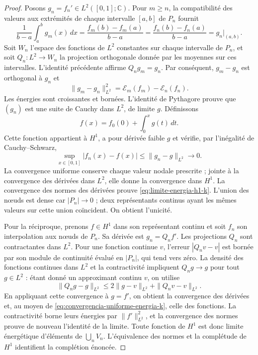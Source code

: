 \begin{proof}
Posons \(g_n=f_n'\in L^2([0,1];\mathbb C)\). Pour
\(m\geq n\), la compatibilité des valeurs aux extrémités de chaque
intervalle \([a,b]\) de \(P_n\) fournit
\[
 \frac1{b-a}\int_a^bg_m(x)\,dx
 =\frac{f_m(b)-f_m(a)}{b-a}
 =\frac{f_n(b)-f_n(a)}{b-a}
 =g_n\big|_{(a,b)}.
\]
Soit \(W_n\) l’espace des fonctions de \(L^2\) constantes sur chaque
intervalle de \(P_n\), et soit \(Q_n:L^2\to W_n\) la projection
orthogonale donnée par les moyennes sur ces intervalles. L’identité
précédente affirme \(Q_ng_m=g_n\). Par conséquent,
\(g_m-g_n\) est orthogonal à \(g_n\) et
\begin{equation}
 \|g_m-g_n\|_{L^2}^2
 =\mathcal E_m(f_m)-\mathcal E_n(f_n).
 \label{eq:pitagoras-gradientes-k}
\end{equation}
Les énergies sont croissantes et bornées. L'identité de Pythagore prouve que \((g_n)\) est une suite de Cauchy dans \(L^2\), de limite \(g\). Définissons
\[
 f(x)=f_0(0)+\int_0^xg(t)\,dt.
\]
Cette fonction appartient à \(H^1\), a pour dérivée faible \(g\) et
vérifie, par l’inégalité de Cauchy--Schwarz,
\begin{equation}
 \sup_{x\in[0,1]}|f_n(x)-f(x)|
 \leq\|g_n-g\|_{L^2}\longrightarrow0.
 \label{eq:convergencia-uniforme-energia-k}
\end{equation}
La convergence uniforme conserve chaque valeur nodale prescrite ; jointe à
la convergence des dérivées dans \(L^2\), elle donne la convergence dans
\(H^1\). La convergence des normes des dérivées prouve
\eqref{eq:limite-energia-h1-k}. L’union des nœuds est dense car
\(|P_n|\to0\) ; deux représentants continus ayant les mêmes valeurs
sur cette union coïncident. On obtient l’unicité.

Pour la réciproque, prenons \(f\in H^1\) dans son représentant continu et soit \(f_n\) son interpolation aux nœuds de \(P_n\). Sa dérivée est \(g_n=Q_nf'\). Les projections \(Q_n\) sont contractantes dans \(L^2\). Pour une fonction continue \(v\), l'erreur \(|Q_nv-v|\) est bornée par son module de continuité évalué en \(|P_n|\), qui tend vers zéro. La densité des fonctions continues dans \(L^2\) et la contractivité impliquent \(Q_ng\to g\) pour tout \(g\in L^2\) : étant donné un approximant continu \(v\), on utilise
\[
 \|Q_ng-g\|_{L^2}
 \leq 2\|g-v\|_{L^2}+\|Q_nv-v\|_{L^2}.
\]
En appliquant cette convergence à \(g=f'\), on obtient la convergence
des dérivées et, au moyen de \eqref{eq:convergencia-uniforme-energia-k},
celle des fonctions. La contractivité borne leurs énergies par
\(\|f'\|_{L^2}^2\), et la convergence des normes prouve de
nouveau l’identité de la limite. Toute fonction de \(H^1\) est donc
limite énergétique d’éléments de \(\bigcup_nV_n\).
L’équivalence des normes et la complétude de \(H^1\) identifient
la complétion énoncée.
\end{proof}

